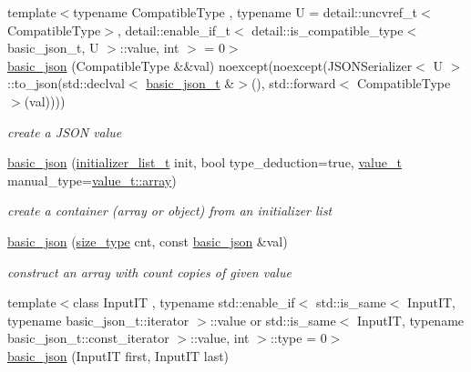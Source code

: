 \begin{DoxyCompactItemize}
{\footnotesize template$<$typename Compatible\+Type , typename U  = detail\+::uncvref\+\_\+t$<$\+Compatible\+Type$>$, detail\+::enable\+\_\+if\+\_\+t$<$ detail\+::is\+\_\+compatible\+\_\+type$<$ basic\+\_\+json\+\_\+t, U $>$\+::value, int $>$  = 0$>$ }\\\hyperlink{classnlohmann_1_1basic__json_a5a6558bfd1be139a638f91f0e09fc737}{basic\+\_\+json} (Compatible\+Type \&\&val) noexcept(noexcept(J\+S\+O\+N\+Serializer$<$ U $>$\+::to\+\_\+json(std\+::declval$<$ \hyperlink{classnlohmann_1_1basic__json_afc4033f5af721feb287b0676723a145f}{basic\+\_\+json\+\_\+t} \&$>$(), std\+::forward$<$ Compatible\+Type $>$(val))))
\begin{DoxyCompactList}\small\item\em create a J\+S\+ON value \end{DoxyCompactList}\item 
\hyperlink{classnlohmann_1_1basic__json_ab5dfd9a2b2663b219641cb7fe59b6da2}{basic\+\_\+json} (\hyperlink{classnlohmann_1_1basic__json_ad70a098fbc01c53497db29d3b5b656a9}{initializer\+\_\+list\+\_\+t} init, bool type\+\_\+deduction=true, \hyperlink{namespacenlohmann_1_1detail_a1ed8fc6239da25abcaf681d30ace4985}{value\+\_\+t} manual\+\_\+type=\hyperlink{namespacenlohmann_1_1detail_a1ed8fc6239da25abcaf681d30ace4985af1f713c9e000f5d3f280adbd124df4f5}{value\+\_\+t\+::array})
\begin{DoxyCompactList}\small\item\em create a container (array or object) from an initializer list \end{DoxyCompactList}\item 
\hyperlink{classnlohmann_1_1basic__json_ab6816ae5100409254ed0a8bc21c387bb}{basic\+\_\+json} (\hyperlink{classnlohmann_1_1basic__json_a39f2cd0b58106097e0e67bf185cc519b}{size\+\_\+type} cnt, const \hyperlink{classnlohmann_1_1basic__json}{basic\+\_\+json} \&val)
\begin{DoxyCompactList}\small\item\em construct an array with count copies of given value \end{DoxyCompactList}\item 
{\footnotesize template$<$class Input\+IT , typename std\+::enable\+\_\+if$<$ std\+::is\+\_\+same$<$ Input\+I\+T, typename basic\+\_\+json\+\_\+t\+::iterator $>$\+::value or std\+::is\+\_\+same$<$ Input\+I\+T, typename basic\+\_\+json\+\_\+t\+::const\+\_\+iterator $>$\+::value, int $>$\+::type  = 0$>$ }\\\hyperlink{classnlohmann_1_1basic__json_abe197e9f3184487805cfb5bba6fd5938}{basic\+\_\+json} (Input\+IT first, Input\+IT last)

\end{DoxyCompactItemize}
